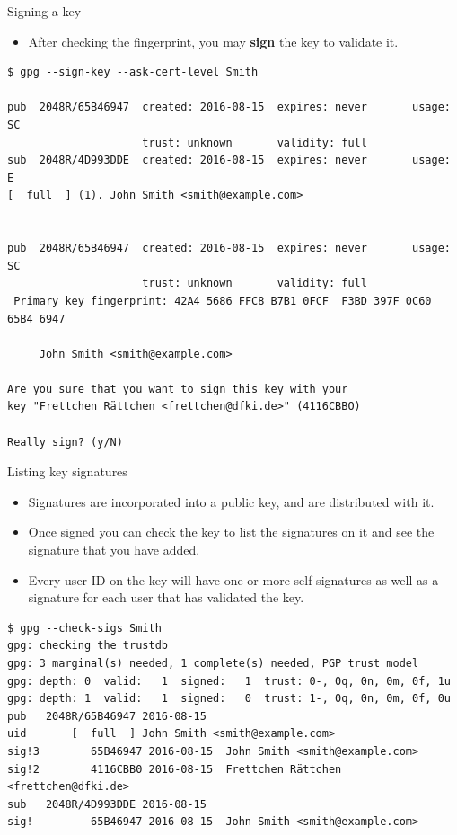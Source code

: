 \documentclass[
mode=present,
paper=smartboard,
size=20pt,
]{powerdot}
\newcommand\vsp{\vspace{-16mm}}
\begin{document}
\makeatletter\renewcommand{\verbatim@font}{\scriptsize\tt}\makeatother
\begin{slide}[method=direct]{Signing a key}
  \begin{itemize}
  \item After checking the fingerprint, you may \textbf{sign} the key
    to validate it.
  \end{itemize}
\vsp
\begin{verbatim}
$ gpg --sign-key --ask-cert-level Smith

pub  2048R/65B46947  created: 2016-08-15  expires: never       usage: SC  
                     trust: unknown       validity: full
sub  2048R/4D993DDE  created: 2016-08-15  expires: never       usage: E   
[  full  ] (1). John Smith <smith@example.com>


pub  2048R/65B46947  created: 2016-08-15  expires: never       usage: SC  
                     trust: unknown       validity: full
 Primary key fingerprint: 42A4 5686 FFC8 B7B1 0FCF  F3BD 397F 0C60 65B4 6947

     John Smith <smith@example.com>

Are you sure that you want to sign this key with your
key "Frettchen Rättchen <frettchen@dfki.de>" (4116CBBO)

Really sign? (y/N)
\end{verbatim}
\end{slide}

\begin{slide}[method=direct]{Listing key signatures}
  \begin{itemize}
  \item Signatures are incorporated into a public key, and are
    distributed with it.
  \item Once signed you can check the key to list the signatures on it
    and see the signature that you have added.
  \item Every user ID on the key will have one or more self-signatures
    as well as a signature for each user that has validated the key.
  \end{itemize}
\vsp
\begin{verbatim}
$ gpg --check-sigs Smith
gpg: checking the trustdb
gpg: 3 marginal(s) needed, 1 complete(s) needed, PGP trust model
gpg: depth: 0  valid:   1  signed:   1  trust: 0-, 0q, 0n, 0m, 0f, 1u
gpg: depth: 1  valid:   1  signed:   0  trust: 1-, 0q, 0n, 0m, 0f, 0u
pub   2048R/65B46947 2016-08-15
uid       [  full  ] John Smith <smith@example.com>
sig!3        65B46947 2016-08-15  John Smith <smith@example.com>
sig!2        4116CBB0 2016-08-15  Frettchen Rättchen <frettchen@dfki.de>
sub   2048R/4D993DDE 2016-08-15
sig!         65B46947 2016-08-15  John Smith <smith@example.com>
\end{verbatim}
\end{slide}
\end{document}
